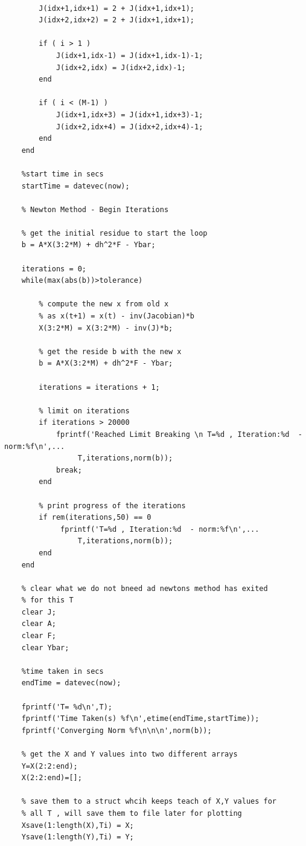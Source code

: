 \documentclass[twoside,12pt]{article}
\begin{document}
\begin{lstlisting}
        
        J(idx+1,idx+1) = 2 + J(idx+1,idx+1);
        J(idx+2,idx+2) = 2 + J(idx+1,idx+1);
        
        if ( i > 1 )
            J(idx+1,idx-1) = J(idx+1,idx-1)-1;
            J(idx+2,idx) = J(idx+2,idx)-1;
        end
        
        if ( i < (M-1) )
            J(idx+1,idx+3) = J(idx+1,idx+3)-1;
            J(idx+2,idx+4) = J(idx+2,idx+4)-1;
        end
    end
        
    %start time in secs
    startTime = datevec(now);
    
    % Newton Method - Begin Iterations
    
    % get the initial residue to start the loop
    b = A*X(3:2*M) + dh^2*F - Ybar;
    
    iterations = 0;
    while(max(abs(b))>tolerance)
        
        % compute the new x from old x
        % as x(t+1) = x(t) - inv(Jacobian)*b
        X(3:2*M) = X(3:2*M) - inv(J)*b;

        % get the reside b with the new x
        b = A*X(3:2*M) + dh^2*F - Ybar;
        
        iterations = iterations + 1;
        
        % limit on iterations 
        if iterations > 20000
            fprintf('Reached Limit Breaking \n T=%d , Iteration:%d  - norm:%f\n',...
                 T,iterations,norm(b));
            break;
        end
        
        % print progress of the iterations
        if rem(iterations,50) == 0
             fprintf('T=%d , Iteration:%d  - norm:%f\n',...
                 T,iterations,norm(b));
        end
    end
    
    % clear what we do not bneed ad newtons method has exited
    % for this T
    clear J;
    clear A;
    clear F;
    clear Ybar;
    
    %time taken in secs
    endTime = datevec(now);
    
    fprintf('T= %d\n',T);
    fprintf('Time Taken(s) %f\n',etime(endTime,startTime));
    fprintf('Converging Norm %f\n\n\n',norm(b));
    
    % get the X and Y values into two different arrays
    Y=X(2:2:end);
    X(2:2:end)=[];
    
    % save them to a struct whcih keeps teach of X,Y values for
    % all T , will save them to file later for plotting
    Xsave(1:length(X),Ti) = X;
    Ysave(1:length(Y),Ti) = Y;
    

\end{lstlisting}
\end{document}
